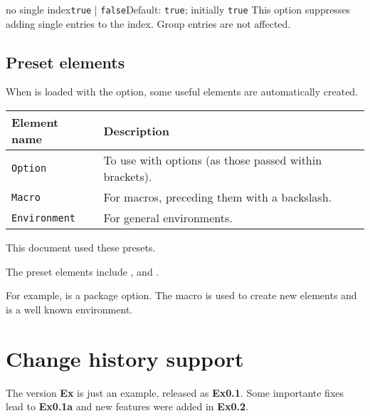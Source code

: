 \documentclass[11pt, outputdir = ./out]{article}
\begin{document}
\begin{Optiondef}{no single index}{\texttt{true} | \texttt{false}}{Default: \texttt{true}; initially \texttt{true}}
    This option suppresses adding single entries to the index. Group entries are not affected.
\end{Optiondef}

\subsection{Preset elements}

When  is loaded with the  option, some useful elements are automatically created.

\bigskip
\begin{tabular}{ll}
    \textbf{Element name} & \textbf{Description}\\
    \hline
    \texttt{Option} & To use with options (as those passed within brackets). \\
    \texttt{Macro} & For macros, preceding them with a backslash. \\
    \texttt{Environment} & For general environments. \\
\end{tabular}

\bigskip
This document used these presets.

\begin{example}{}
    The preset elements include ,  and .

    For example,  is a package option. The  macro is used to create new elements and  is a well known environment.
\end{example}


\section{Change history support}

\begin{latexcode}
\end{latexcode}

\begin{example}{}
    The version \textbf{Ex} is just an example, released as \textbf{Ex0.1}. Some importante fixes lead to \textbf{Ex0.1a} and new features were added in \textbf{Ex0.2}.
\end{example}
\end{document}
